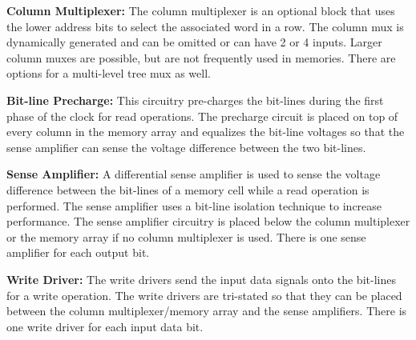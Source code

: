 {\bf Column Multiplexer:} The column multiplexer is an optional block
that uses the lower address bits to select the associated word in a
row. The column mux is dynamically generated and can be omitted or can
have 2 or 4 inputs. Larger column muxes are possible, but are not
frequently used in memories. There are options for a multi-level tree
mux as well.

{\bf Bit-line Precharge:} This circuitry pre-charges
the bit-lines during the first phase of the clock for read
operations. The precharge circuit is placed on top of every column in
the memory array and equalizes the bit-line voltages so that the
sense amplifier can sense the voltage difference between the two
bit-lines.

{\bf Sense Amplifier:} A differential sense amplifier is used to sense
the voltage difference between the bit-lines of a memory cell while a
read operation is performed.  The sense amplifier uses a bit-line
isolation technique to increase performance. The sense amplifier
circuitry is placed below the column multiplexer or the memory
array if no column multiplexer is used. There is one sense amplifier for
each output bit.

{\bf Write Driver:} The write drivers send the input data signals onto the
bit-lines for a write operation. The write drivers are tri-stated
so that they can be placed between the column multiplexer/memory array
and the sense amplifiers. There is one write driver for each input
data bit.



